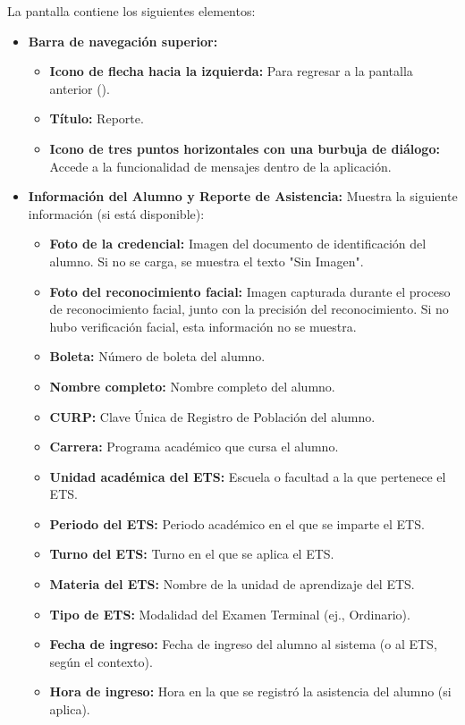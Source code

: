 La pantalla contiene los siguientes elementos:
\begin{itemize}
	\item \textbf{Barra de navegación superior:}
	\begin{itemize}
		\item \textbf{Icono de flecha hacia la izquierda:} Para regresar a la pantalla anterior ().
		\item \textbf{Título:} Reporte.
		\item \textbf{Icono de tres puntos horizontales con una burbuja de diálogo:} Accede a la funcionalidad de mensajes dentro de la aplicación.
	\end{itemize}
	\item \textbf{Información del Alumno y Reporte de Asistencia:} Muestra la siguiente información (si está disponible):
	\begin{itemize}
		\item \textbf{Foto de la credencial:} Imagen del documento de identificación del alumno. Si no se carga, se muestra el texto "Sin Imagen".
		\item \textbf{Foto del reconocimiento facial:} Imagen capturada durante el proceso de reconocimiento facial, junto con la precisión del reconocimiento. Si no hubo verificación facial, esta información no se muestra.
		\item \textbf{Boleta:} Número de boleta del alumno.
		\item \textbf{Nombre completo:} Nombre completo del alumno.
		\item \textbf{CURP:} Clave Única de Registro de Población del alumno.
		\item \textbf{Carrera:} Programa académico que cursa el alumno.
		\item \textbf{Unidad académica del ETS:} Escuela o facultad a la que pertenece el ETS.
		\item \textbf{Periodo del ETS:} Periodo académico en el que se imparte el ETS.
		\item \textbf{Turno del ETS:} Turno en el que se aplica el ETS.
		\item \textbf{Materia del ETS:} Nombre de la unidad de aprendizaje del ETS.
		\item \textbf{Tipo de ETS:} Modalidad del Examen Terminal (ej., Ordinario).
		\item \textbf{Fecha de ingreso:} Fecha de ingreso del alumno al sistema (o al ETS, según el contexto).
		\item \textbf{Hora de ingreso:} Hora en la que se registró la asistencia del alumno (si aplica).

\end{itemize}
\end{itemize}
